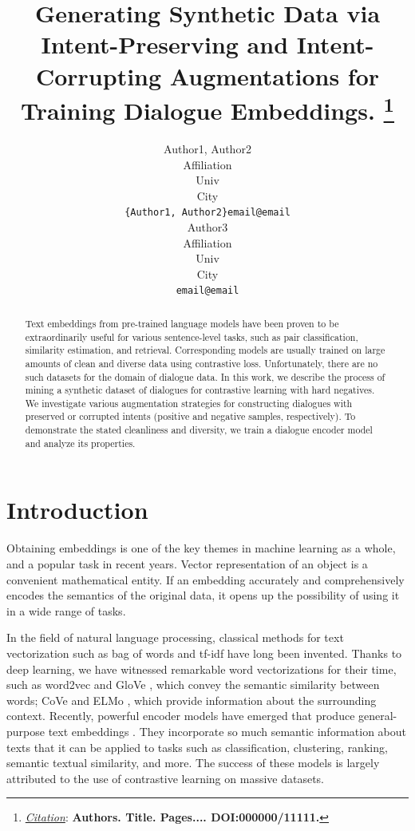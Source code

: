 \documentclass{article}
\title{Generating Synthetic Data via Intent-Preserving and Intent-Corrupting Augmentations for Training Dialogue Embeddings.
\thanks{\textit{\underline{Citation}}: 
\textbf{Authors. Title. Pages.... DOI:000000/11111.}} 
}
\author{
  Author1, Author2 \\
  Affiliation \\
  Univ \\
  City\\
  \texttt{\{Author1, Author2\}email@email} \\
   \And
  Author3 \\
  Affiliation \\
  Univ \\
  City\\
  \texttt{email@email} \\
}
\begin{document}
\maketitle


\begin{abstract}
Text embeddings from pre-trained language models have been proven to be extraordinarily useful for various sentence-level tasks, such as pair classification, similarity estimation, and retrieval. Corresponding models are usually trained on large amounts of clean and diverse data using contrastive loss. Unfortunately, there are no such datasets for the domain of dialogue data. In this work, we describe the process of mining a synthetic dataset of dialogues for contrastive learning with hard negatives. We investigate various augmentation strategies for constructing dialogues with preserved or corrupted intents (positive and negative samples, respectively). To demonstrate the stated cleanliness and diversity, we train a dialogue encoder model and analyze its properties.
\end{abstract}




\section{Introduction}
Obtaining embeddings is one of the key themes in machine learning as a whole, and a popular task in recent years. Vector representation of an object is a convenient mathematical entity. If an embedding accurately and comprehensively encodes the semantics of the original data, it opens up the possibility of using it in a wide range of tasks.

In the field of natural language processing, classical methods for text vectorization such as bag of words \cite{bow} and tf-idf \cite{SprckJones2021ASI} have long been invented. Thanks to deep learning, we have witnessed remarkable word vectorizations for their time, such as word2vec \cite{mikolov2013efficient} and GloVe \cite{pennington-etal-2014-glove}, which convey the semantic similarity between words; CoVe \cite{mccann2018learned} and ELMo \cite{peters-etal-2018-deep}, which provide information about the surrounding context. Recently, powerful encoder models have emerged that produce general-purpose text embeddings \cite{xiao2023cpack, wang2022text, li2023general}. They incorporate so much semantic information about texts that it can be applied to tasks such as classification, clustering, ranking, semantic textual similarity, and more. The success of these models is largely attributed to the use of contrastive learning on massive datasets. 
\end{document}
